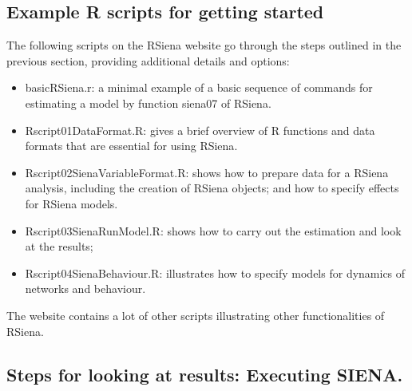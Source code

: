 \documentclass[a4paper,fleqn,11pt]{article}
\newcommand{\+}{\, + \,}
\newcommand{\sfn}[1]{\textsf{#1}}
\newcommand{\R}{{\sf R }}
\newcommand{\rs}{{\sf RSiena}}
\newcommand{\RS}{{\sf \textsf{RSiena} }}
\newcommand{\si}{{\sf SIENA}}
\begin{document}
\subsection{Example \R scripts for getting started}
\label{R_scripts}
The following scripts on the \RS website go through the steps
outlined in the previous section, providing additional details and options: \\
\begin{itemize}
    \item \sfn{basicRSiena.r}: a minimal example of a basic sequence of commands
           for estimating a model by function \sfn{siena07} of \rs.
	\item \sfn{Rscript01DataFormat.R}: gives a brief overview of \R functions
            and data formats that are essential for using \rs.
	\item \sfn{Rscript02SienaVariableFormat.R}: shows how to prepare data
            for a \RS analysis, including the creation of \RS objects;
            and how to specify effects for \RS models.
	\item \sfn{Rscript03SienaRunModel.R}:
           shows how to carry out the estimation and look at the results;
	\item \sfn{Rscript04SienaBehaviour.R}: illustrates
      how to specify models for dynamics of networks and behaviour.
\end{itemize}
The website contains a lot of other scripts illustrating other functionalities
of \rs.


\subsection{Steps for looking at results: Executing \si .}
\label{S_exec}
\end{document}
